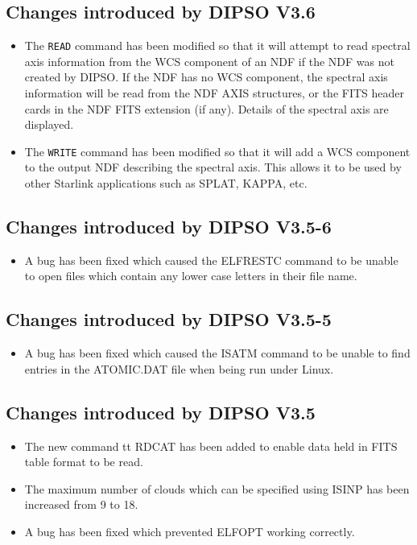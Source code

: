 \documentclass[twoside,11pt]{article}
\renewcommand{\_}{\texttt{\symbol{95}}}
\begin{document}
\subsection{Changes introduced by DIPSO V3.6}
\begin{itemize}
\item The {\tt READ} command has been modified so that it will attempt to
read spectral axis information from the WCS component of an NDF if the NDF
was not created by DIPSO. If the NDF has no WCS component, the spectral
axis information will be read from the NDF AXIS structures, or the FITS header 
cards in the NDF FITS extension (if any). Details of the spectral axis are 
displayed.
\item The {\tt WRITE} command has been modified so that it will add a WCS
component to the output NDF describing the spectral axis. This allows it
to be used by other Starlink applications such as SPLAT, KAPPA, etc.
\end{itemize}

\subsection{Changes introduced by DIPSO V3.5-6}
\begin{itemize}
\item A bug has been fixed which caused the ELFRESTC command to be unable to
open files which contain any lower case letters in their file name.
\end{itemize}

\subsection{Changes introduced by DIPSO V3.5-5}
\begin{itemize}
\item A bug has been fixed which caused the ISATM command to be unable to
find entries in the ATOMIC.DAT file when being run under Linux.
\end{itemize}

\subsection{Changes introduced by DIPSO V3.5}
\begin{itemize}
\item The new command {tt RDCAT} has been added to enable data held in FITS 
table format to be read.
\item The maximum number of clouds which can be specified using ISINP has
been increased from 9 to 18.
\item A bug has been fixed which prevented ELFOPT working correctly.
\end{itemize}
\end{document}
